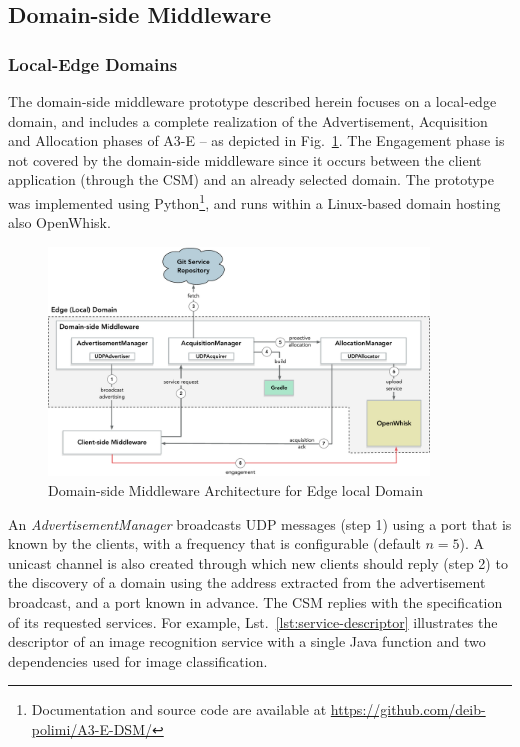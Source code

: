 \subsection{Domain-side Middleware}

\subsubsection{Local-Edge Domains}

The domain-side middleware prototype described herein focuses on a local-edge domain, and includes a complete realization of the Advertisement, Acquisition and Allocation phases of A3-E -- as depicted in Fig.~\ref{fig:local-edge-domain-prototype}. The Engagement phase is not covered by the domain-side middleware since it occurs between the client application (through the CSM) and an already selected domain. The prototype was implemented using Python\footnote{Documentation and source code are available at \url{https://github.com/deib-polimi/A3-E-DSM/}}, and runs within a Linux-based domain hosting also OpenWhisk. 


\begin{figure}[tbp]
	\includegraphics[width=0.9\textwidth]{figs/a3e-domain-prototype}
	\caption{Domain-side Middleware Architecture for Edge local Domain}
	\label{fig:local-edge-domain-prototype}
\end{figure}

An \textit{AdvertisementManager} broadcasts UDP messages (step 1) using a port that is known by the clients, with a frequency that is configurable (default $n=5$). A unicast channel is also created through which new clients should reply (step 2) to the discovery of a domain using the address extracted from the advertisement broadcast, and a port known in advance. The CSM replies with the specification of its requested services. For example, Lst.~\ref{lst:service-descriptor} illustrates the descriptor of an image recognition service with a single Java function and two dependencies used for image classification.

